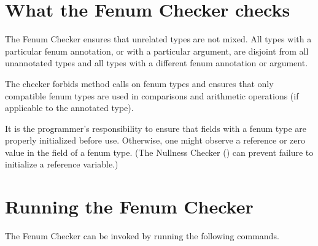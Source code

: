 \section{What the Fenum Checker checks\label{fenum-checks}}

The Fenum Checker ensures that unrelated types are not mixed.
All types with a particular fenum annotation, or  with a particular  argument, are
disjoint from all unannotated types and all types with a different fenum
annotation or  argument.

The checker forbids method calls on fenum types and ensures that
only compatible fenum types are used in comparisons and arithmetic operations
(if applicable to the annotated type).

It is the programmer's responsibility to ensure that fields with a fenum type
are properly initialized before use.  Otherwise, one might observe a 
reference or zero value in the field of a fenum type.  (The Nullness Checker
() can prevent failure to initialize a
reference variable.)


\section{Running the Fenum Checker\label{fenum-running}}

The Fenum Checker can be invoked by running the following commands.

